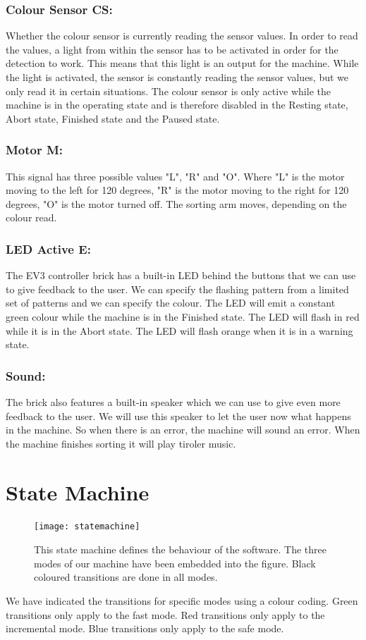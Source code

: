 \documentclass[a4paper,oneside,11pt]{article}
\begin{document}
\subsubsection{Colour Sensor CS:} Whether the colour sensor is currently reading the sensor values. In order to read the values, a light from within the sensor has to be activated in order for the detection to work. This means that this light is an output for the machine. While the light is activated, the sensor is constantly reading the sensor values, but we only read it in certain situations. The colour sensor is only active while the machine is in the operating state and is therefore disabled in the Resting state, Abort state, Finished state and the Paused state.
\subsubsection{Motor M:} This signal has three possible values "L", "R" and "O". Where "L" is the motor moving to the left for 120 degrees, "R" is the motor moving to the right for 120 degrees, "O" is the motor turned off. The sorting arm moves, depending on the colour read.
\subsubsection{LED Active E:} The EV3 controller brick has a built-in LED behind the buttons that we can use to give feedback to the user. We can specify the flashing pattern from a limited set of patterns and we can specify the colour. The LED will emit a constant green colour while the machine is in the Finished state. The LED will flash in red while it is in the Abort state. The LED will flash orange when it is in a warning state.
\subsubsection{Sound:} The brick also features a built-in speaker which we can use to give even more feedback to the user. We will use this speaker to let the user now what happens in the machine. So when there is an error, the machine will sound an error. When the machine finishes sorting it will play tiroler music.

\section{State Machine}
\begin{figure}[H]
	\centering
	\texttt{[image: statemachine]}
	\caption{This state machine defines the behaviour of the software. The three modes of our machine have been embedded into the figure. Black coloured transitions are done in all modes.}
\end{figure}
We have indicated the transitions for specific modes using a colour coding. Green transitions only apply to the fast mode. Red transitions only apply to the incremental mode. Blue transitions only apply to the safe mode. 
\end{document}
